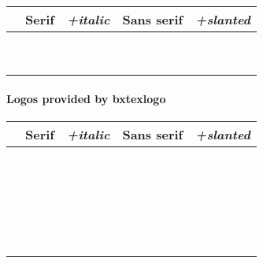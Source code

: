 \documentclass[a4paper]{article}
\newcommand{\Pkg}[1]{\textsf{#1}}
\newenvironment{LogoSamples}{%
  \begin{center}\begin{tabular}{ccccc}
    \hline \phantom{\LARGE I}
        & \textrm{Serif} & \textit{+italic}
        & \textsf{Sans serif} & \textsl{+slanted}
    \\\hline
}{%
    \hline
  \end{tabular}\end{center}
}
\newcommand*{\LSEntry}[1]{%
  \texttt{\string#1} & \textrm{#1} & \textit{#1}
      & \textsf{#1} & \textsf{\textsl{#1}}
  \\}
\begin{document}
\begin{LogoSamples}
\LSEntry{\HanTheThanh}
\LSEntry{\KOMAScript}
\LSEntry{\LaTeXTeX}
\LSEntry{\NTS}
\LSEntry{\PiCTeX}
\LSEntry{\SageTeX}
\LSEntry{\SLiTeX}
\LSEntry{\teTeX}
\LSEntry{\TTH}
\end{LogoSamples}

\paragraph{Logos provided by \Pkg{bxtexlogo}}\mbox{}

\begin{LogoSamples}
\LSEntry{\HeVeA}
\LSEntry{\JBibTeX}
\LSEntry{\JLaTeX}
\LSEntry{\JTeX}
\LSEntry{\KaTeX}
\LSEntry{\KET}
\LSEntry{\KETpic}
\LSEntry{\LaTeXiT}
\LSEntry{\LaTeXML}
\LSEntry{\logoAleph}
\LSEntry{\logoLambda}
\LSEntry{\logoLamed}
\LSEntry{\logoOmega}
\LSEntry{\pTeXsT}
\LSEntry{\XyM}
\LSEntry{\XyMTeX}
\LSEntry{\BaSiX}
\LSEntry{\TeXonLaTeX}
\LSEntry{\OneTeX}
\LSEntry{\SuyahTeX}
\LSEntry{\SATySFi}
\LSEntry{\ApTeX}
\LSEntry{\DVIPDFMx}
\end{LogoSamples}
\end{document}
